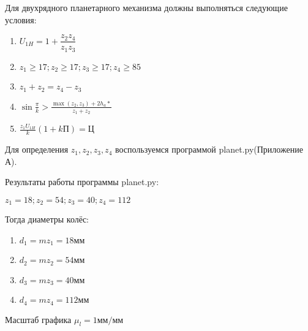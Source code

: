 Для двухрядного планетарного механизма должны выполняться следующие условия:

\begin{enumerate}
	\item $ U_{1H} = 1 + \dfrac{z_2 z_4}{z_1 z_3}$
	\item $z_1 \geqslant 17; z_2 \geqslant 17; z_3 \geqslant 17; z_4 \geqslant 85$
	\item $z_1 + z_2 = z_4 - z_3$
	\item $\sin{\frac{\pi}{k}} > \frac{\max(z_2, z_3) + 2 h_a*}{z_1 + z_2}$
	\item $ \frac{z_1 U_{1H}}{k}(1 + kП) = Ц$
\end{enumerate}

Для определения $z_1, z_2, z_3, z_4$ воспользуемся программой planet.py(Приложение А).

Результаты работы программы planet.py:

$z_1 = 18; z_2 = 54; z_3 = 40; z_4 = 112$

Тогда диаметры колёс:

\begin{enumerate}
	\item $d_1 = mz_1 = 18 мм$
	\item $d_2 = mz_2 = 54 мм$
	\item $ d_3 = mz_3 = 40 мм $
	\item $ d_4 = mz_4 = 112 мм $
\end{enumerate}

Масштаб графика $\mu_l = 1 мм/мм$